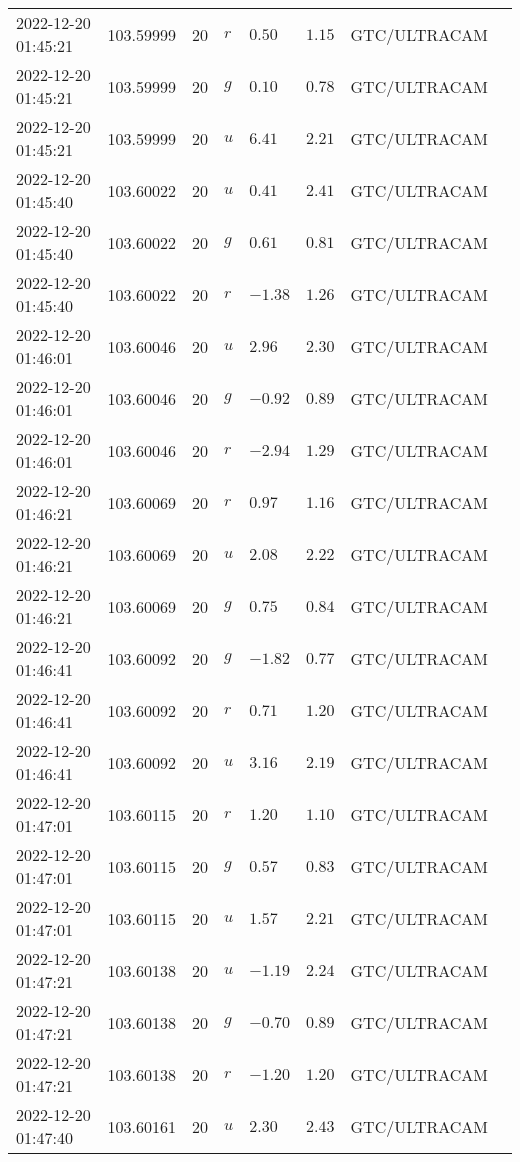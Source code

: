 \documentclass{nature_plusfigure}
\begin{document}
\begin{supplement}
\begin{center}
\begin{longtable}{llllllll}
2022-12-20 01:45:21 & 103.59999 & 20 & $r$ & $0.50$ & $1.15$ & GTC/ULTRACAM &  \\ 
2022-12-20 01:45:21 & 103.59999 & 20 & $g$ & $0.10$ & $0.78$ & GTC/ULTRACAM &  \\ 
2022-12-20 01:45:21 & 103.59999 & 20 & $u$ & $6.41$ & $2.21$ & GTC/ULTRACAM &  \\ 
2022-12-20 01:45:40 & 103.60022 & 20 & $u$ & $0.41$ & $2.41$ & GTC/ULTRACAM &  \\ 
2022-12-20 01:45:40 & 103.60022 & 20 & $g$ & $0.61$ & $0.81$ & GTC/ULTRACAM &  \\ 
2022-12-20 01:45:40 & 103.60022 & 20 & $r$ & $-1.38$ & $1.26$ & GTC/ULTRACAM &  \\ 
2022-12-20 01:46:01 & 103.60046 & 20 & $u$ & $2.96$ & $2.30$ & GTC/ULTRACAM &  \\ 
2022-12-20 01:46:01 & 103.60046 & 20 & $g$ & $-0.92$ & $0.89$ & GTC/ULTRACAM &  \\ 
2022-12-20 01:46:01 & 103.60046 & 20 & $r$ & $-2.94$ & $1.29$ & GTC/ULTRACAM &  \\ 
2022-12-20 01:46:21 & 103.60069 & 20 & $r$ & $0.97$ & $1.16$ & GTC/ULTRACAM &  \\ 
2022-12-20 01:46:21 & 103.60069 & 20 & $u$ & $2.08$ & $2.22$ & GTC/ULTRACAM &  \\ 
2022-12-20 01:46:21 & 103.60069 & 20 & $g$ & $0.75$ & $0.84$ & GTC/ULTRACAM &  \\ 
2022-12-20 01:46:41 & 103.60092 & 20 & $g$ & $-1.82$ & $0.77$ & GTC/ULTRACAM &  \\ 
2022-12-20 01:46:41 & 103.60092 & 20 & $r$ & $0.71$ & $1.20$ & GTC/ULTRACAM &  \\ 
2022-12-20 01:46:41 & 103.60092 & 20 & $u$ & $3.16$ & $2.19$ & GTC/ULTRACAM &  \\ 
2022-12-20 01:47:01 & 103.60115 & 20 & $r$ & $1.20$ & $1.10$ & GTC/ULTRACAM &  \\ 
2022-12-20 01:47:01 & 103.60115 & 20 & $g$ & $0.57$ & $0.83$ & GTC/ULTRACAM &  \\ 
2022-12-20 01:47:01 & 103.60115 & 20 & $u$ & $1.57$ & $2.21$ & GTC/ULTRACAM &  \\ 
2022-12-20 01:47:21 & 103.60138 & 20 & $u$ & $-1.19$ & $2.24$ & GTC/ULTRACAM &  \\ 
2022-12-20 01:47:21 & 103.60138 & 20 & $g$ & $-0.70$ & $0.89$ & GTC/ULTRACAM &  \\ 
2022-12-20 01:47:21 & 103.60138 & 20 & $r$ & $-1.20$ & $1.20$ & GTC/ULTRACAM &  \\ 
2022-12-20 01:47:40 & 103.60161 & 20 & $u$ & $2.30$ & $2.43$ & GTC/ULTRACAM &  \\ 

\end{longtable}
\end{center}
\end{supplement}
\end{document}
